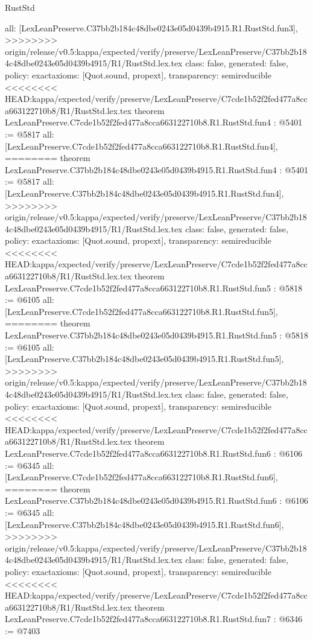 \begin{lexlean}{RustStd}
\begin{coremodule}
{\begin{coremodule}
{{{{{{{  all: [LexLeanPreserve.C37bb2b184c48dbe0243e05d0439b4915.R1.RustStd.fun3],
>>>>>>>> origin/release/v0.5:kappa/expected/verify/preserve/LexLeanPreserve/C37bb2b184c48dbe0243e05d0439b4915/R1/RustStd.lex.tex
  class: false,
  generated: false,
  policy: exact{axioms: [Quot.sound, propext]},
  transparency: semireducible
}
<<<<<<<< HEAD:kappa/expected/verify/preserve/LexLeanPreserve/C7cde1b52f2fed477a8cca663122710b8/R1/RustStd.lex.tex
theorem LexLeanPreserve.C7cde1b52f2fed477a8cca663122710b8.R1.RustStd.fun4 : @5401 := @5817 {
  all: [LexLeanPreserve.C7cde1b52f2fed477a8cca663122710b8.R1.RustStd.fun4],
========
theorem LexLeanPreserve.C37bb2b184c48dbe0243e05d0439b4915.R1.RustStd.fun4 : @5401 := @5817 {
  all: [LexLeanPreserve.C37bb2b184c48dbe0243e05d0439b4915.R1.RustStd.fun4],
>>>>>>>> origin/release/v0.5:kappa/expected/verify/preserve/LexLeanPreserve/C37bb2b184c48dbe0243e05d0439b4915/R1/RustStd.lex.tex
  class: false,
  generated: false,
  policy: exact{axioms: [Quot.sound, propext]},
  transparency: semireducible
}
<<<<<<<< HEAD:kappa/expected/verify/preserve/LexLeanPreserve/C7cde1b52f2fed477a8cca663122710b8/R1/RustStd.lex.tex
theorem LexLeanPreserve.C7cde1b52f2fed477a8cca663122710b8.R1.RustStd.fun5 : @5818 := @6105 {
  all: [LexLeanPreserve.C7cde1b52f2fed477a8cca663122710b8.R1.RustStd.fun5],
========
theorem LexLeanPreserve.C37bb2b184c48dbe0243e05d0439b4915.R1.RustStd.fun5 : @5818 := @6105 {
  all: [LexLeanPreserve.C37bb2b184c48dbe0243e05d0439b4915.R1.RustStd.fun5],
>>>>>>>> origin/release/v0.5:kappa/expected/verify/preserve/LexLeanPreserve/C37bb2b184c48dbe0243e05d0439b4915/R1/RustStd.lex.tex
  class: false,
  generated: false,
  policy: exact{axioms: [Quot.sound, propext]},
  transparency: semireducible
}
<<<<<<<< HEAD:kappa/expected/verify/preserve/LexLeanPreserve/C7cde1b52f2fed477a8cca663122710b8/R1/RustStd.lex.tex
theorem LexLeanPreserve.C7cde1b52f2fed477a8cca663122710b8.R1.RustStd.fun6 : @6106 := @6345 {
  all: [LexLeanPreserve.C7cde1b52f2fed477a8cca663122710b8.R1.RustStd.fun6],
========
theorem LexLeanPreserve.C37bb2b184c48dbe0243e05d0439b4915.R1.RustStd.fun6 : @6106 := @6345 {
  all: [LexLeanPreserve.C37bb2b184c48dbe0243e05d0439b4915.R1.RustStd.fun6],
>>>>>>>> origin/release/v0.5:kappa/expected/verify/preserve/LexLeanPreserve/C37bb2b184c48dbe0243e05d0439b4915/R1/RustStd.lex.tex
  class: false,
  generated: false,
  policy: exact{axioms: [Quot.sound, propext]},
  transparency: semireducible
}
<<<<<<<< HEAD:kappa/expected/verify/preserve/LexLeanPreserve/C7cde1b52f2fed477a8cca663122710b8/R1/RustStd.lex.tex
theorem LexLeanPreserve.C7cde1b52f2fed477a8cca663122710b8.R1.RustStd.fun7 : @6346 := @7403 {
}}}}}}}}}}
\end{coremodule}}
\end{coremodule}
\end{lexlean}

